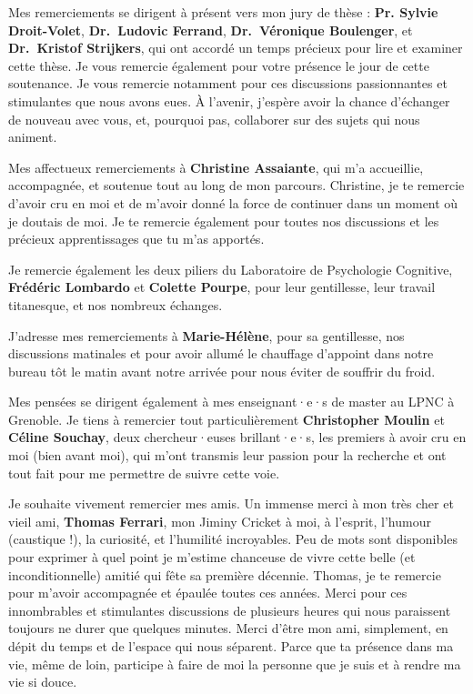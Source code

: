 \documentclass[
  a4paper,12pt,twoside,onecolumn,openright,final,oldfontcommands]{memoir}
\begin{document}
Mes remerciements se dirigent à présent vers mon jury de thèse : \textbf{Pr. Sylvie Droit-Volet}, \textbf{Dr.~Ludovic Ferrand}, \textbf{Dr.~Véronique Boulenger}, et \textbf{Dr.~Kristof Strijkers}, qui ont accordé un temps précieux pour lire et examiner cette thèse. Je vous remercie également pour votre présence le jour de cette soutenance. Je vous remercie notamment pour ces discussions passionnantes et stimulantes que nous avons eues. À l'avenir, j'espère avoir la chance d'échanger de nouveau avec vous, et, pourquoi pas, collaborer sur des sujets qui nous animent.

Mes affectueux remerciements à \textbf{Christine Assaiante}, qui m'a accueillie, accompagnée, et soutenue tout au long de mon parcours. Christine, je te remercie d'avoir cru en moi et de m'avoir donné la force de continuer dans un moment où je doutais de moi. Je te remercie également pour toutes nos discussions et les précieux apprentissages que tu m'as apportés.

Je remercie également les deux piliers du Laboratoire de Psychologie Cognitive, \textbf{Frédéric Lombardo} et \textbf{Colette Pourpe}, pour leur gentillesse, leur travail titanesque, et nos nombreux échanges.

J'adresse mes remerciements à \textbf{Marie-Hélène}, pour sa gentillesse, nos discussions matinales et pour avoir allumé le chauffage d'appoint dans notre bureau tôt le matin avant notre arrivée pour nous éviter de souffrir du froid.

Mes pensées se dirigent également à mes enseignant·e·s de master au LPNC à Grenoble. Je tiens à remercier tout particulièrement \textbf{Christopher Moulin} et \textbf{Céline Souchay}, deux chercheur·euses brillant·e·s, les premiers à avoir cru en moi (bien avant moi), qui m'ont transmis leur passion pour la recherche et ont tout fait pour me permettre de suivre cette voie.

Je souhaite vivement remercier mes amis. Un immense merci à mon très cher et vieil ami, \textbf{Thomas Ferrari}, mon Jiminy Cricket à moi, à l'esprit, l'humour (caustique !), la curiosité, et l'humilité incroyables. Peu de mots sont disponibles pour exprimer à quel point je m'estime chanceuse de vivre cette belle (et inconditionnelle) amitié qui fête sa première décennie. Thomas, je te remercie pour m'avoir accompagnée et épaulée toutes ces années. Merci pour ces innombrables et stimulantes discussions de plusieurs heures qui nous paraissent toujours ne durer que quelques minutes. Merci d'être mon ami, simplement, en dépit du temps et de l'espace qui nous séparent. Parce que ta présence dans ma vie, même de loin, participe à faire de moi la personne que je suis et à rendre ma vie si douce.
\end{document}
